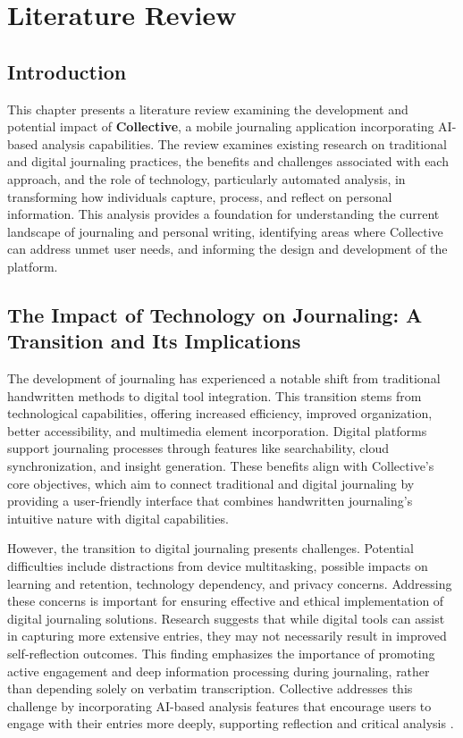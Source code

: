 \chapter{Literature Review}\label{ch:literature}

\section{Introduction}\label{sec:intro}

This chapter presents a literature review examining the development and potential impact of \textbf{Collective}, a mobile journaling application incorporating AI-based analysis capabilities. The review examines existing research on traditional and digital journaling practices, the benefits and challenges associated with each approach, and the role of technology, particularly automated analysis, in transforming how individuals capture, process, and reflect on personal information. This analysis provides a foundation for understanding the current landscape of journaling and personal writing, identifying areas where Collective can address unmet user needs, and informing the design and development of the platform.

\section{The Impact of Technology on Journaling: A Transition and Its Implications}\label{sec:technology-impact}

The development of journaling has experienced a notable shift from traditional handwritten methods to digital tool integration. This transition stems from technological capabilities, offering increased efficiency, improved organization, better accessibility, and multimedia element incorporation. Digital platforms support journaling processes through features like searchability, cloud synchronization, and insight generation. These benefits align with Collective's core objectives, which aim to connect traditional and digital journaling by providing a user-friendly interface that combines handwritten journaling's intuitive nature with digital capabilities.

However, the transition to digital journaling presents challenges. Potential difficulties include distractions from device multitasking, possible impacts on learning and retention, technology dependency, and privacy concerns. Addressing these concerns is important for ensuring effective and ethical implementation of digital journaling solutions. Research suggests that while digital tools can assist in capturing more extensive entries, they may not necessarily result in improved self-reflection outcomes. This finding emphasizes the importance of promoting active engagement and deep information processing during journaling, rather than depending solely on verbatim transcription. Collective addresses this challenge by incorporating AI-based analysis features that encourage users to engage with their entries more deeply, supporting reflection and critical analysis \cite{baikadi2016exploring}.

